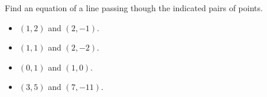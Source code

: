\begin{frame}
\begin{example}
Find an equation of a line passing though the indicated pairs of points.
\begin{itemize}
\item $(1,2)$ and $(2,-1)$.
\item $(1,1)$ and $(2,-2)$.
\item $(0,1)$ and $(1,0)$.
\item $(3,5)$ and $(7,-11)$.
\end{itemize}
\end{example}
\end{frame}